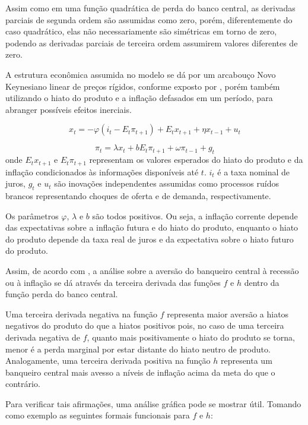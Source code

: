 \documentclass[
	article,			%
	11pt,				%
	oneside,			%
	a4paper,			%
	english,			%
	brazil,				%
	]{abntex2}
\begin{document}
	Assim como em uma função quadrática de perda do banco central, as derivadas parciais de segunda ordem são assumidas como zero, porém, diferentemente do caso quadrático, elas não necessariamente são simétricas em torno de zero, podendo as derivadas parciais de terceira ordem assumirem valores diferentes de zero.
	
	A estrutura econômica assumida no modelo se dá por um arcabouço Novo Keynesiano linear de preços rígidos, conforme exposto por , porém também utilizando o hiato do produto e a inflação defasados em um período, para abranger possíveis efeitos inerciais.
		
	\begin{equation}  \label{curva_is}
		x_t=-\varphi(i_t-E_t\pi_{t+1}) + E_tx_{t+1} + \eta x_{t-1} + u_t
	\end{equation}
	
	\begin{equation} \label{curva_phillips}
		\pi_t = \lambda x_t + bE_t\pi_{t+1} + \omega \pi_{t-1} + g_t
	\end{equation}
%
	onde $E_tx_{t+1}$ e $E_t\pi_{t+1}$ representam os valores esperados do hiato do produto e da inflação condicionados às informações disponíveis até $t$. $i_t$ é a taxa nominal de juros, $g_t$ e $u_t$ são inovações independentes assumidas como processos ruídos brancos representando choques de oferta e de demanda, respectivamente. 
	
	Os parâmetros $\varphi$, $\lambda$ e $b$ são todos positivos. Ou seja, a inflação corrente depende das expectativas sobre a inflação futura e do hiato do produto, enquanto o hiato do produto depende da taxa real de juros e da expectativa sobre o hiato futuro do produto.
	
	Assim, de acordo com , a análise sobre a aversão do banqueiro central à recessão ou à inflação se dá através da terceira derivada das funções $f$ e $h$ dentro da função perda do banco central. 
	
	Uma terceira derivada negativa na função $f$ representa maior aversão a hiatos negativos do produto do que a hiatos positivos pois, no caso de uma terceira derivada negativa de $f$, quanto mais positivamente o hiato do produto se torna, menor é a perda marginal por estar distante do hiato neutro de produto. Analogamente, uma terceira derivada positiva na função $h$ representa um banqueiro central mais avesso a níveis de inflação acima da meta do que o contrário.	
	
	Para verificar tais afirmações, uma análise gráfica pode se mostrar útil. Tomando como exemplo as seguintes formais funcionais para $f$ e $h$:
	
\end{document}
